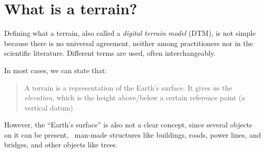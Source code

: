 
\setchapterpreamble[u]{\margintoc}

\chapter{What is a terrain?}%
\label{chap:whatisterrain}

\graphicspath{{whatisterrain/}}







Defining what a terrain, also called a \emph{digital terrain model} (DTM), is not simple because there is no universal agreement, neither among practitioners nor in the scientific literature.
Different terms are used, often interchangeably.

In most cases, we can state that:

\begin{quote}
A terrain is a representation of the Earth's surface. 
It gives us the \emph{elevation}, which is the height above/below a certain reference point (a vertical datum)
\end{quote}

However, the ``Earth's surface'' is also not a clear concept, since several objects on it can be present, \eg\ man-made structures like buildings, roads, power lines, and bridges, and other objects like trees.

